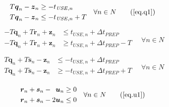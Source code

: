 \begin{equation}
    \begin{split}
        \begin{alignedat}{2}
            T \boldsymbol{q}_{n} - \boldsymbol{z}_{n} &\ge
            - t_{\mathit{USE},n}\\
            T \boldsymbol{q}_{n} - \boldsymbol{z}_{n} &\le
            - t_{\mathit{USE},n} + T\\
        \end{alignedat}
    \end{split}
    \quad \forall n \in N
    \tag{\ref{eq.q1}}
\end{equation}
\begin{equation}
    \begin{split}
        \begin{alignedat}{2}
            -T \boldsymbol{q}_{n} + T \boldsymbol{r}_{n} + \boldsymbol{z}_{n}
            &\le t_{\mathit{USE},n} + \Delta t_{\mathit{PREP}}\\
            -T \boldsymbol{q}_{n} + T \boldsymbol{r}_{n} + \boldsymbol{z}_{n}
            &\ge t_{\mathit{USE},n} + \Delta t_{\mathit{PREP}} - T\\
            \end{alignedat}
        \quad \forall n \in N
    \end{split}
    \label{eq.r2}
\end{equation}
\begin{equation}
    \begin{split}
        \begin{alignedat}{2}
            T \boldsymbol{q}_{n} + T \boldsymbol{s}_{n} - \boldsymbol{z}_{n}
            &\le -t_{\mathit{USE},n} + \Delta t_{\mathit{PREP}}\\
            T \boldsymbol{q}_{n} + T \boldsymbol{s}_{n} - \boldsymbol{z}_{n}
            &\ge -t_{\mathit{USE},n} + \Delta t_{\mathit{PREP}} + T\\
            \end{alignedat}
        \quad \forall n \in N
    \end{split}
    \label{eq.s2}
\end{equation}
\begin{equation}
    \begin{split}
        \begin{alignedat}{8}
            &&\boldsymbol{r}_{n} && {}+{} &&\boldsymbol{s}_{n} && {}-{} 
            &&\boldsymbol{u}_{n} &\ge 0\\
            &&\boldsymbol{r}_{n} && {}+{} &&\boldsymbol{s}_{n} && {}-{} 
            &2&\boldsymbol{u}_{n} &\le 0\\
        \end{alignedat}
        \quad \forall n \in N
    \end{split}
    \tag{\ref{eq.u1}}
\end{equation}
